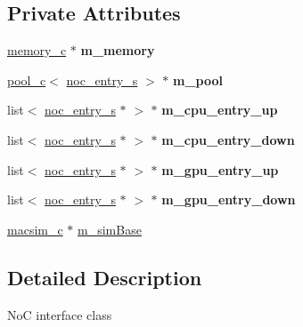 \subsection*{Private Attributes}
\begin{DoxyCompactItemize}
\item 
\hypertarget{classnoc__c_a347c2e3dcf9c5dfb97e5b3566f04fb24}{
\hyperlink{classmemory__c}{memory\_\-c} $\ast$ {\bfseries m\_\-memory}}
\label{classnoc__c_a347c2e3dcf9c5dfb97e5b3566f04fb24}

\item 
\hypertarget{classnoc__c_acdb2642b6945ebda3aae039b56f9372c}{
\hyperlink{classpool__c}{pool\_\-c}$<$ \hyperlink{structnoc__entry__s}{noc\_\-entry\_\-s} $>$ $\ast$ {\bfseries m\_\-pool}}
\label{classnoc__c_acdb2642b6945ebda3aae039b56f9372c}

\item 
\hypertarget{classnoc__c_a103461e69bbfded5d4d4f5bb82182957}{
list$<$ \hyperlink{structnoc__entry__s}{noc\_\-entry\_\-s} $\ast$ $>$ $\ast$ {\bfseries m\_\-cpu\_\-entry\_\-up}}
\label{classnoc__c_a103461e69bbfded5d4d4f5bb82182957}

\item 
\hypertarget{classnoc__c_a790a19529072e2f1717c136816350027}{
list$<$ \hyperlink{structnoc__entry__s}{noc\_\-entry\_\-s} $\ast$ $>$ $\ast$ {\bfseries m\_\-cpu\_\-entry\_\-down}}
\label{classnoc__c_a790a19529072e2f1717c136816350027}

\item 
\hypertarget{classnoc__c_a22800cde10b08f89ad96c8532aabc213}{
list$<$ \hyperlink{structnoc__entry__s}{noc\_\-entry\_\-s} $\ast$ $>$ $\ast$ {\bfseries m\_\-gpu\_\-entry\_\-up}}
\label{classnoc__c_a22800cde10b08f89ad96c8532aabc213}

\item 
\hypertarget{classnoc__c_a1e886512b84469d2d5735ebf7effb43b}{
list$<$ \hyperlink{structnoc__entry__s}{noc\_\-entry\_\-s} $\ast$ $>$ $\ast$ {\bfseries m\_\-gpu\_\-entry\_\-down}}
\label{classnoc__c_a1e886512b84469d2d5735ebf7effb43b}

\item 
\hyperlink{classmacsim__c}{macsim\_\-c} $\ast$ \hyperlink{classnoc__c_a2b62f87d3e010b3b935f16bf769db2bf}{m\_\-simBase}
\end{DoxyCompactItemize}


\subsection{Detailed Description}
NoC interface class 

